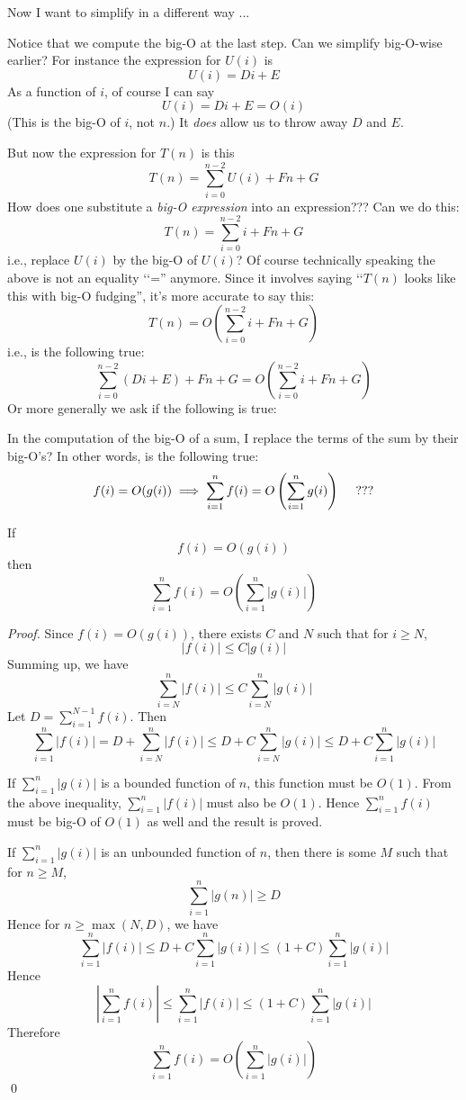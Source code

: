 \newpage

Now I want to simplify in a different way ...

Notice that we compute the big-O at the last step.
Can we simplify big-O-wise earlier?
For instance the expression for $U(i)$ is
\[
U(i) = Di + E
\]
As a function of $i$, of course I can say
\[
U(i) = Di + E = O(i)
\]
(This is the big-O of $i$, not $n$.)
It \textit{ does} allow us to throw away $D$ and $E$.

But now the expression for $T(n)$ is this
\[T(n) = \sum_{i=0}^{n-2} U(i) + Fn + G
\]
How does one substitute a \textit{ big-O expression} into an expression???
Can we do this:
\[
T(n) =
\sum_{i=0}^{n-2} i + Fn + G
\]
i.e., replace $U(i)$ by the big-O of $U(i)$?
Of course technically speaking the above is not an equality \lq\lq =''
anymore.
Since it involves saying \lq\lq $T(n)$ looks like this
with big-O fudging'', it's more accurate to say this: 
\[
T(n) =
O\left( \sum_{i=0}^{n-2} i + Fn + G \right)
\]
i.e., is the following true:
\[
\sum_{i = 0}^{n - 2} (Di + E) + Fn + G
= 
O\left( \sum_{i=0}^{n-2} i + Fn + G \right)
\]
Or more generally we ask if the following is true:

In the computation of the 
big-O of a sum, I replace the terms of the sum by
their big-O's? In other words, is the following true:
\[
f(i) = O(g(i)) \implies
\sum_{i=1}^n f(i) 
= 
O
\left(
\sum_{i=1}^n g(i)
\right)
\hspace{0.5cm} ???
\] 


\begin{thm}
If 
\[
f(i) = O(g(i))
\]
then
\[
\sum_{i=1}^n f(i) 
= 
O
\left(
\sum_{i=1}^n |g(i)|
\right)
\] 
\end{thm}

\textit{ Proof.}
Since $f(i) = O(g(i))$, there exists $C$ and $N$
such that for $i \geq N$,
\[
|f(i)| \leq C |g(i)|
\]
Summing up, we have
\[
\sum_{i=N}^n |f(i)| \leq C \sum_{i=N}^n |g(i)|
\]
Let $D = \sum_{i=1}^{N-1} f(i)$.
Then
\[
\sum_{i=1}^n |f(i)| 
= D + \sum_{i=N}^n |f(i)| 
\leq D + C \sum_{i=N}^n |g(i)|
\leq D + C \sum_{i=1}^n |g(i)|
\]

If $\sum_{i=1}^n |g(i)|$ is a bounded function of $n$,
this function must be $O(1)$.
From the above inequality,
$\sum_{i=1}^n |f(i)|$
must also be $O(1)$.
Hence $\sum_{i=1}^n f(i)$ must be big-O of $O(1)$
as well and the result is proved.

If $\sum_{i=1}^n |g(i)|$ is an unbounded function of $n$,
then there is some $M$ such that for $n \geq M$,
\[
\sum_{i=1}^n |g(n)| \geq D
\]
Hence for $n \geq \max(N, D)$, we have
\[
\sum_{i=1}^n |f(i)| 
\leq D + C \sum_{i=1}^n |g(i)|
\leq (1 + C) \sum_{i=1}^n |g(i)|
\]
Hence 
\[
\left| \sum_{i=1}^n f(i) \right| 
\leq \sum_{i=1}^n |f(i)| 
\leq (1 + C) \sum_{i=1}^n |g(i)|
\]
Therefore 
\[
\sum_{i=1}^n f(i)
=
O \left( \sum_{i=1}^n |g(i)| \right)
\]
\qed

